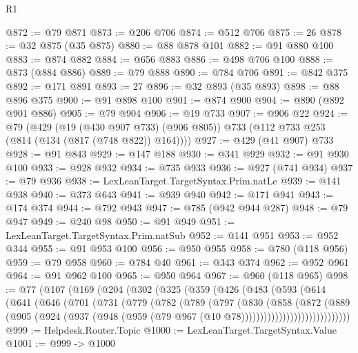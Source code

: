 \begin{lexlean}{R1}
\begin{coremodule}
@872 := @79 @871
@873 := @206 @706
@874 := @512 @706
@875 := 26
@878 := @32 @875 (@35 @875)
@880 := @88 @878 @101
@882 := @91 @880 @100
@883 := @874 @882
@884 := @656 @883
@886 := @498 @706 @100
@888 := @873 (@884 @886)
@889 := @79 @888
@890 := @784 @706
@891 := @842 @375
@892 := @171 @891
@893 := 27
@896 := @32 @893 (@35 @893)
@898 := @88 @896 @375
@900 := @91 @898 @100
@901 := @874 @900
@904 := @890 (@892 @901 @886)
@905 := @79 @904
@906 := @19 @733
@907 := @906 @22
@924 := @79
    (@429
      (@19 (@430 @907 @733) (@906 @805))
      @733
      (@112 @733 @253 (@814 (@134 (@817 (@748 @822)) @164))))
@927 := @429 (@41 @907) @733
@928 := @91 @843
@929 := @147 @188
@930 := @341 @929
@932 := @91 @930 @100
@933 := @928 @932
@934 := @735 @933
@936 := @927 (@741 @934)
@937 := @79 @936
@938 := LexLeanTarget.TargetSyntax.Prim.natLe
@939 := @141 @938
@940 := @373 @643
@941 := @939 @940
@942 := @171 @941
@943 := @174 @374
@944 := @792 @943
@947 := @785 (@942 @944 @287)
@948 := @79 @947
@949 := @240 @98
@950 := @91 @949
@951 := LexLeanTarget.TargetSyntax.Prim.natSub
@952 := @141 @951
@953 := @952 @344
@955 := @91 @953 @100
@956 := @950 @955
@958 := @780 (@118 @956)
@959 := @79 @958
@960 := @784 @40
@961 := @343 @374
@962 := @952 @961
@964 := @91 @962 @100
@965 := @950 @964
@967 := @960 (@118 @965)
@998 := @77
    (@107
      (@169
        (@204
          (@302
            (@325
              (@359
                (@426
                  (@483
                    (@593
                      (@614
                        (@641
                          (@646
                            (@701
                              (@731
                                (@779
                                  (@782
                                    (@789
                                      (@797
                                        (@830
                                          (@858
                                            (@872
                                              (@889
                                                (@905
                                                  (@924
                                                    (@937
                                                      (@948
                                                        (@959
                                                          (@79
                                                            @967
                                                            (@10 @78)))))))))))))))))))))))))))))
@999 := Helpdesk.Router.Topic
@1000 := LexLeanTarget.TargetSyntax.Value
@1001 := @999 -> @1000

\end{coremodule}
\end{lexlean}
